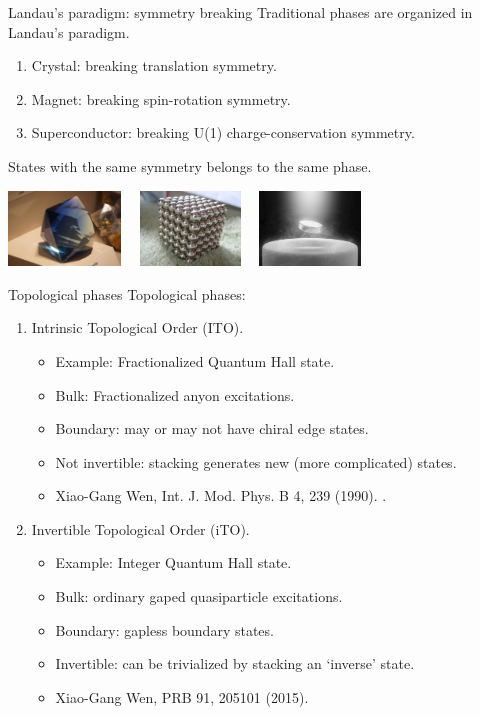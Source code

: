 \documentclass[xcolor=table, 10pt, aspectratio=43]{beamer}
\begin{document}
\begin{frame}{Landau's paradigm: symmetry breaking}
  Traditional phases are organized in Landau's paradigm.
  \begin{enumerate}
  \item Crystal: breaking translation symmetry.
  \item Magnet: breaking spin-rotation symmetry.
  \item Superconductor: breaking U(1) charge-conservation symmetry.
  \end{enumerate}
	States with the same symmetry belongs to the same phase.
  \begin{center}
    \includegraphics[height=2cm]{../resources/crystal}~~
    \includegraphics[height=2cm]{../resources/magnet}~~
    \includegraphics[height=2cm]{../resources/sc}
  \end{center}
\end{frame}

\begin{frame}{Topological phases}
	Topological phases:
	\begin{enumerate}
		\item Intrinsic Topological Order (ITO). 
		\begin{itemize}
			\item Example: Fractionalized Quantum Hall state.
			\item Bulk: Fractionalized anyon excitations.
			\item Boundary: may or may not have chiral edge states.
			\item Not invertible: stacking generates new (more complicated) states.
			\item Xiao-Gang Wen, Int. J. Mod. Phys. B 4, 239 (1990).
			.
		\end{itemize}
		\item Invertible Topological Order (iTO).
		\begin{itemize}
			\item Example: Integer Quantum Hall state.
			\item Bulk: ordinary gaped quasiparticle excitations.
			\item Boundary: gapless boundary states.
			\item Invertible: can be trivialized by stacking an `inverse' state.
			\item Xiao-Gang Wen, PRB 91, 205101 (2015).
		\end{itemize}
	\end{enumerate}
\end{frame}
\end{document}
